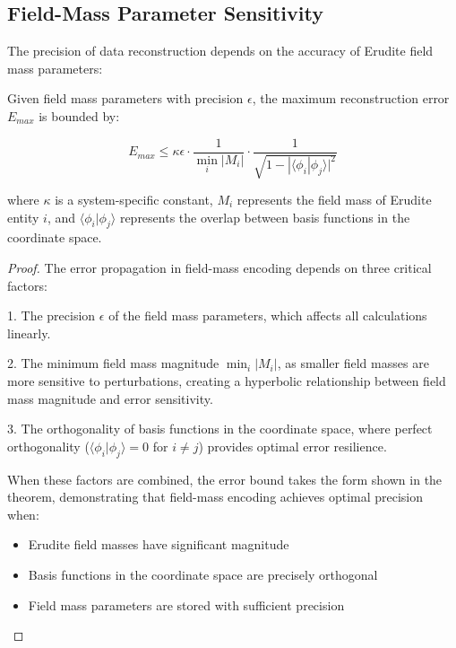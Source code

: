 \subsection{Field-Mass Parameter Sensitivity}

The precision of data reconstruction depends on the accuracy of Erudite field mass parameters:

\begin{theorem}
Given field mass parameters with precision $\epsilon$, the maximum reconstruction error $E_{max}$ is bounded by:

\begin{equation}
E_{max} \leq \kappa \epsilon \cdot \frac{1}{\min_i |M_i|} \cdot \frac{1}{\sqrt{1 - |\langle \phi_i|\phi_j \rangle|^2}}
\end{equation}

where $\kappa$ is a system-specific constant, $M_i$ represents the field mass of Erudite entity $i$, and $\langle \phi_i|\phi_j \rangle$ represents the overlap between basis functions in the coordinate space.
\end{theorem}

\begin{proof}
The error propagation in field-mass encoding depends on three critical factors:

1. The precision $\epsilon$ of the field mass parameters, which affects all calculations linearly.

2. The minimum field mass magnitude $\min_i |M_i|$, as smaller field masses are more sensitive to perturbations, creating a hyperbolic relationship between field mass magnitude and error sensitivity.

3. The orthogonality of basis functions in the coordinate space, where perfect orthogonality ($\langle \phi_i|\phi_j \rangle = 0$ for $i \neq j$) provides optimal error resilience.

When these factors are combined, the error bound takes the form shown in the theorem, demonstrating that field-mass encoding achieves optimal precision when:
\begin{itemize}
    \item Erudite field masses have significant magnitude
    \item Basis functions in the coordinate space are precisely orthogonal
    \item Field mass parameters are stored with sufficient precision
\end{itemize}
\end{proof}

